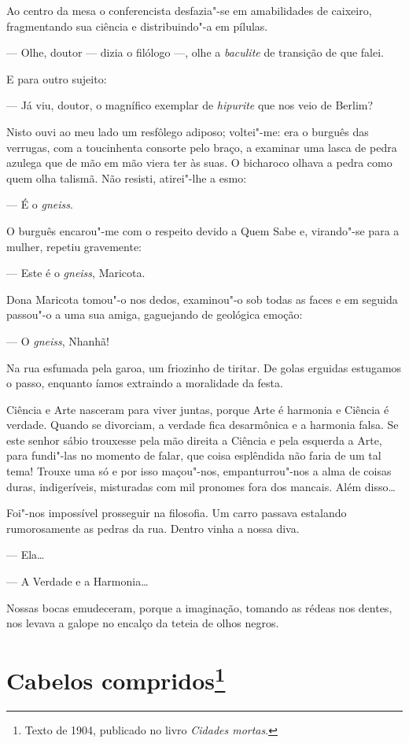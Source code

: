 Ao centro da mesa o conferencista desfazia"-se em amabilidades de
caixeiro, fragmentando sua ciência e distribuindo"-a em pílulas.

--- Olhe, doutor --- dizia o filólogo ---, olhe a \emph{baculite} de
transição de que falei.

E para outro sujeito:

--- Já viu, doutor, o magnífico exemplar de \emph{hipurite} que nos veio
de Berlim?

Nisto ouvi ao meu lado um resfôlego adiposo; voltei"-me: era o burguês
das verrugas, com a toucinhenta consorte pelo braço, a examinar uma
lasca de pedra azulega que de mão em mão viera ter às suas. O bicharoco
olhava a pedra como quem olha talismã. Não resisti, atirei"-lhe a esmo:

--- É o \emph{gneiss}.

O burguês encarou"-me com o respeito devido a Quem Sabe e, virando"-se
para a mulher, repetiu gravemente:

--- Este é o \emph{gneiss}, Maricota.

Dona Maricota tomou"-o nos dedos, examinou"-o sob todas as faces e em
seguida passou"-o a uma sua amiga, gaguejando de geológica emoção:

--- O \emph{gneiss}, Nhanhã!

Na rua esfumada pela garoa, um friozinho de tiritar. De golas erguidas
estugamos o passo, enquanto íamos extraindo a moralidade da festa.

Ciência e Arte nasceram para viver juntas, porque Arte é harmonia e
Ciência é verdade. Quando se divorciam, a verdade fica desarmônica e a
harmonia falsa. Se este senhor sábio trouxesse pela mão direita a
Ciência e pela esquerda a Arte, para fundi"-las no momento de falar, que
coisa esplêndida não faria de um tal tema! Trouxe uma só e por isso
maçou"-nos, empanturrou"-nos a alma de coisas duras, indigeríveis,
misturadas com mil pronomes fora dos mancais. Além disso\ldots{}

Foi"-nos impossível prosseguir na filosofia. Um carro passava estalando
rumorosamente as pedras da rua. Dentro vinha a nossa diva.

--- Ela\ldots{}

--- A Verdade e a Harmonia\ldots{}

Nossas bocas emudeceram, porque a imaginação, tomando as rédeas nos
dentes, nos levava a galope no encalço da teteia de olhos negros.

\chapter{Cabelos compridos\footnote[*]{Texto de 1904, publicado no livro \emph{Cidades mortas}.}}


